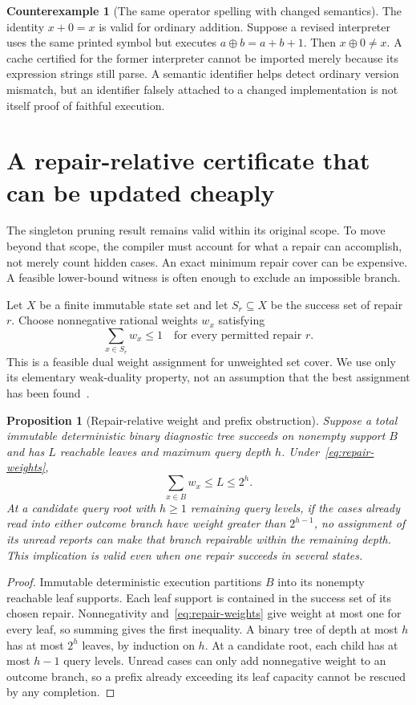 \documentclass[11pt,letterpaper]{article}
\theoremstyle{plain}
\newtheorem{proposition}[theorem]{Proposition}
\theoremstyle{definition}
\newtheorem{counterexample}[theorem]{Counterexample}
\begin{document}
\begin{counterexample}[The same operator spelling with changed semantics]\label{ex:semantic-cache}
The identity $x+0=x$ is valid for ordinary addition. Suppose a revised interpreter uses the same printed symbol but executes $a\mathbin{\oplus}b=a+b+1$. Then $x\mathbin{\oplus}0\ne x$. A cache certified for the former interpreter cannot be imported merely because its expression strings still parse. A semantic identifier helps detect ordinary version mismatch, but an identifier falsely attached to a changed implementation is not itself proof of faithful execution.
\end{counterexample}

\section{A repair-relative certificate that can be updated cheaply}\label{sec:weighted-pruning}
The singleton pruning result remains valid within its original scope. To move beyond that scope, the compiler must account for what a repair can accomplish, not merely count hidden cases. An exact minimum repair cover can be expensive. A feasible lower-bound witness is often enough to exclude an impossible branch.

Let $X$ be a finite immutable state set and let $S_r\subseteq X$ be the success set of repair $r$. Choose nonnegative rational weights $w_x$ satisfying
\begin{equation}\label{eq:repair-weights}
 \sum_{x\in S_r}w_x\le1\quad\text{for every permitted repair }r.
\end{equation}
This is a feasible dual weight assignment for unweighted set cover. We use only its elementary weak-duality property, not an assumption that the best assignment has been found~\cite{williamson}.

\begin{proposition}[Repair-relative weight and prefix obstruction]\label{prop:weighted-cover}
Suppose a total immutable deterministic binary diagnostic tree succeeds on nonempty support $B$ and has $L$ reachable leaves and maximum query depth $h$. Under~\eqref{eq:repair-weights},
\[
 \sum_{x\in B}w_x\le L\le2^h.
\]
At a candidate query root with $h\ge1$ remaining query levels, if the cases already read into either outcome branch have weight greater than $2^{h-1}$, no assignment of its unread reports can make that branch repairable within the remaining depth. This implication is valid even when one repair succeeds in several states.
\end{proposition}
\begin{proof}
Immutable deterministic execution partitions $B$ into its nonempty reachable leaf supports. Each leaf support is contained in the success set of its chosen repair. Nonnegativity and~\eqref{eq:repair-weights} give weight at most one for every leaf, so summing gives the first inequality. A binary tree of depth at most $h$ has at most $2^h$ leaves, by induction on $h$. At a candidate root, each child has at most $h-1$ query levels. Unread cases can only add nonnegative weight to an outcome branch, so a prefix already exceeding its leaf capacity cannot be rescued by any completion.
\end{proof}
\end{document}
